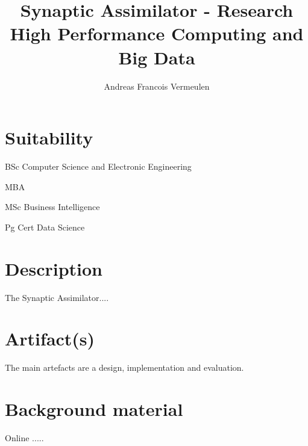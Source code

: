 \documentclass{sta-article}
\title{Synaptic Assimilator - Research High Performance Computing and Big Data}
\author{Andreas Francois Vermeulen}
\date{\printdate{2015-08-30}}
\begin{document}
\maketitle
\chapter{Suitability}

BSc Computer Science and Electronic Engineering

MBA

MSc Business Intelligence

Pg Cert Data Science

\chapter{Description}
The Synaptic Assimilator....

\chapter{Artifact(s)}

The main artefacts are a design, implementation and evaluation.

\chapter{Background material}

Online .....
\end{document}
